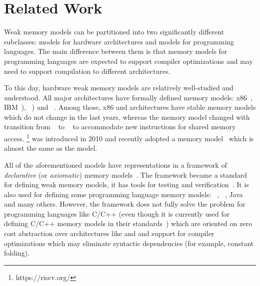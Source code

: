 \section{Related Work}
\label{sec:related}
Weak memory models can be partitioned into two significantly different subclasses:
models for hardware architectures and models for programming languages.
The main difference between them is that memory models for programming languages
are expected to support compiler optimizations and may need to support compilation
to different architectures.

To this day, hardware weak memory models are relatively well-studied and understood.
All major architectures have formally defined memory models:
x86~\cite{Sewell-al:CACM10},
IBM~\POWER \cite{Alglave-DAMP09,Sarkar-al:PLDI11,Alglave-al:TOPLAS14}),
\ARM~\cite{Chong-ASPLOS08, Alglave-DAMP09,Pulte-al:POPL18,Flur-al:POPL16,Alglave-al:TOPLAS14})
and \RISC~\cite{Pulte-al:POPL18}.
Among those, x86 and \POWER architectures have stable memory models which do not change in the last years,
whereas the \ARM memory model changed with transition from ~\cite{Alglave-al:TOPLAS14} to ~\cite{Pulte-al:POPL18}
to accommodate new instructions for shared memory access.
\RISC\footnote{https://riscv.org/} was introduced in 2010 and recently adopted a memory model~\cite{Pulte-al:POPL18}
which is almost the same as the  model.

All of the aforementioned models have representations in a framework of \emph{declarative} (or \emph{axiomatic})
memory models~\cite{Alglave-al:TOPLAS14}.
The framework became a standard for defining weak memory models, %
it has tools for testing and verification~\cite{Alglave-al:TOPLAS14}.
It is also used for defining some programming language memory models: 
\CPP~\cite{Batty-al:POPL11}, \JS~\cite{Watt-al:PLDI2020}, Java~\cite{Manson-al:POPL05} and many others.
However, the framework does not fully solve the problem for programming languages like C/C++
(even though it is currently used for defining C/C++ memory models in their standards~\cite{Batty-al:POPL11})
which are oriented on zero cost abstraction over architectures like \ARM and \POWER and support for compiler
optimizations which may eliminate syntactic dependencies (for example, constant folding).

